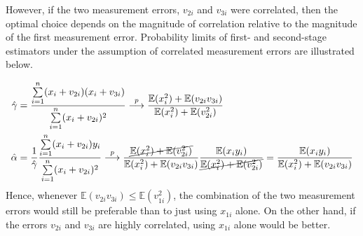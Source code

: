 \documentclass[]{article}
\begin{document}
However, if the two measurement errors, $v_{2i}$ and $v_{3i}$ were correlated, then the optimal choice depends on the magnitude of correlation relative to the magnitude of the first measurement error. Probability limits of first- and second-stage estimators under the assumption of correlated measurement errors are illustrated below.

\begin{equation}
	\begin{split}
		\hat{\gamma}& = \frac{\sum\limits_{i = 1}^n (x_i + v_{2i})(x_i + v_{3i})}{\sum\limits_{i = 1}^n (x_i + v_{2i})^2}\overset{p}{\longrightarrow} \frac{\mathbb{E}(x_i^2) + \mathbb{E}(v_{2i}v_{3i})}{\mathbb{E}(x_i^2) + \mathbb{E}(v_{2i}^2)} \\ \nonumber
		\hat{\alpha}& = \frac{1}{\hat{\gamma}}\frac{\sum\limits_{i = 1}^n(x_i + v_{2i})y_i}{\sum\limits_{i = 1}^n(x_i + v_{2i})^2} \overset{p}{\longrightarrow}\frac{\cancel{\mathbb{E}(x_i^2) + \mathbb{E}(v_{2i}^2)}}{\mathbb{E}(x_i^2) + \mathbb{E}(v_{2i}v_{3i})}\frac{\mathbb{E}(x_iy_i)}{\cancel{\mathbb{E}(x_i^2) + \mathbb{E}(v_{2i}^2)}} = \frac{\mathbb{E}(x_iy_i)}{\mathbb{E}(x_i^2) + \mathbb{E}(v_{2i}v_{3i})}
	\end{split}
\end{equation}
Hence, whenever $\mathbb{E}(v_{2i}v_{3i})\leq\mathbb{E}(v_{1i}^2)$, the combination of the two measurement errors would still be preferable than to just using $x_{1i}$ alone. On the other hand, if the errors $v_{2i}$ and $v_{3i}$ are highly correlated, using $x_{1i}$ alone would be better.
\end{document}

